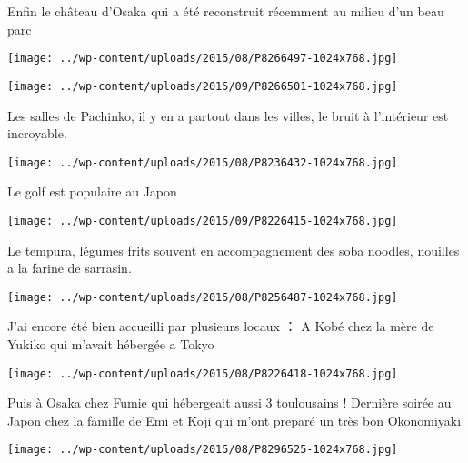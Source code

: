  \newline
 Enfin le château d'Osaka qui a été reconstruit récemment au milieu d'un beau parc \newline
 \newline
\centerline{\texttt{[image: ../wp-content/uploads/2015/08/P8266497-1024x768.jpg]} } 
 \newline
 \newline
\centerline{\texttt{[image: ../wp-content/uploads/2015/09/P8266501-1024x768.jpg]} } 
 \newline
 Les salles de Pachinko, il y en a partout dans les villes, le bruit à l'intérieur est incroyable. \newline
 \newline
\centerline{\texttt{[image: ../wp-content/uploads/2015/08/P8236432-1024x768.jpg]} } 
 \newline
 Le golf est populaire au Japon \newline
 \newline
\centerline{\texttt{[image: ../wp-content/uploads/2015/09/P8226415-1024x768.jpg]} } 
 \newline
 Le tempura, légumes frits souvent en accompagnement des soba noodles, nouilles a la farine de sarrasin. \newline
 \newline
\centerline{\texttt{[image: ../wp-content/uploads/2015/08/P8256487-1024x768.jpg]} } 
 \newline
 J'ai encore été bien accueilli par plusieurs locaux ： \newline
 A Kobé chez la mère de Yukiko qui m'avait hébergée a Tokyo \newline
 \newline
\centerline{\texttt{[image: ../wp-content/uploads/2015/08/P8226418-1024x768.jpg]} } 
 \newline
 Puis à Osaka chez Fumie qui hébergeait aussi 3 toulousains ! \newline
 Dernière soirée au Japon chez la famille de Emi et Koji qui m'ont preparé un très bon Okonomiyaki \newline
 \newline
\centerline{\texttt{[image: ../wp-content/uploads/2015/08/P8296525-1024x768.jpg]} } 
 \newline

\newpage
 
